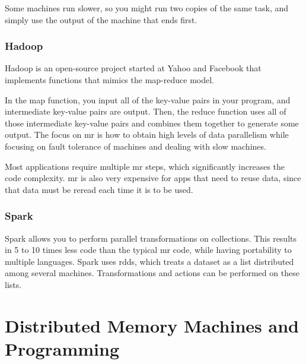 \documentclass[10pt]{article}
\newcounter{subsubsubsection}[subsubsection]
\begin{document}
\begin{flushleft}
Some machines run slower, so you might run two copies of the same task, and simply use the output of the machine that ends first. 

\subsubsection{Hadoop}

Hadoop is an open-source project started at Yahoo and Facebook that implements functions that mimics the map-reduce model. 


In the map function, you input all of the key-value pairs in your program, and intermediate key-value pairs are output. Then, the reduce function uses all of those intermediate key-value pairs and combines them together to generate some output. The focus on \gls{mr} is how to obtain high levels of data parallelism while focusing on fault tolerance of machines and dealing with slow machines.

Most applications require multiple \gls{mr} steps, which significantly increases the code complexity. \gls{mr} is also very expensive for apps that need to reuse data, since that data must be reread each time it is to be used.

\subsubsection{Spark}

Spark allows you to perform parallel transformations on collections. This results in 5 to 10 times less code than the typical \gls{mr} code, while having portability to multiple languages. Spark uses \gls{rdd}s, which treats a dataset as a list distributed among several machines. Transformations and actions can be performed on these lists. 

\section{Distributed Memory Machines and Programming}

\end{flushleft}
\end{document}
